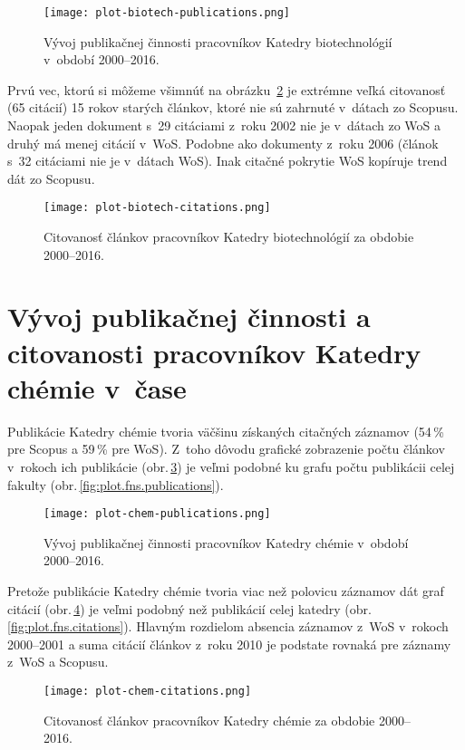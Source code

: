 \begin{figure}
  \centering
  \texttt{[image: plot-biotech-publications.png]}
  \caption{Vývoj publikačnej činnosti pracovníkov Katedry biotechnológií
    v~období 2000--2016.}
  \label{fig:plot.biotech.publications}
\end{figure}

Prvú vec, ktorú si môžeme všimnúť na obrázku~\ref{fig:plot.biotech.citations} je
extrémne veľká citovanosť (65 citácií) 15 rokov starých článkov, ktoré nie sú
zahrnuté v~dátach zo Scopusu.  Naopak jeden dokument s~29 citáciami z~roku 2002
nie je v~dátach zo WoS a druhý má menej citácií v~WoS.  Podobne ako dokumenty
z~roku 2006 (článok s~32 citáciami nie je v~dátach WoS).  Inak citačné pokrytie
WoS kopíruje trend dát zo Scopusu.

\begin{figure}
  \centering
  \texttt{[image: plot-biotech-citations.png]}
  \caption{Citovanosť článkov pracovníkov Katedry biotechnológií za obdobie
    2000--2016.}
  \label{fig:plot.biotech.citations}
\end{figure}


\section{Vývoj publikačnej činnosti a citovanosti pracovníkov Katedry chémie
  v~čase}

Publikácie Katedry chémie tvoria väčšinu získaných citačných záznamov (54\,\%
pre Scopus a 59\,\% pre WoS).  Z~toho dôvodu grafické zobrazenie počtu článkov
v~rokoch ich publikácie (obr.\,\ref{fig:plot.chem.publications}) je veľmi
podobné ku grafu počtu publikácii celej fakulty
(obr.\,\ref{fig:plot.fns.publications}).

\begin{figure}
  \centering
  \texttt{[image: plot-chem-publications.png]}
  \caption{Vývoj publikačnej činnosti pracovníkov Katedry chémie v~období
    2000--2016.}
  \label{fig:plot.chem.publications}
\end{figure}

Pretože publikácie Katedry chémie tvoria viac než polovicu záznamov dát graf
citácií (obr.\,\ref{fig:plot.chem.citations}) je veľmi podobný než publikácií
celej katedry (obr.\,\ref{fig:plot.fns.citations}).  Hlavným rozdielom absencia
záznamov z~WoS v~rokoch 2000--2001 a suma citácií článkov z~roku 2010 je
podstate rovnaká pre záznamy z~WoS a Scopusu.

\begin{figure}
  \centering
  \texttt{[image: plot-chem-citations.png]}
  \caption{Citovanosť článkov pracovníkov Katedry chémie za obdobie 2000--2016.}
  \label{fig:plot.chem.citations}
\end{figure}


